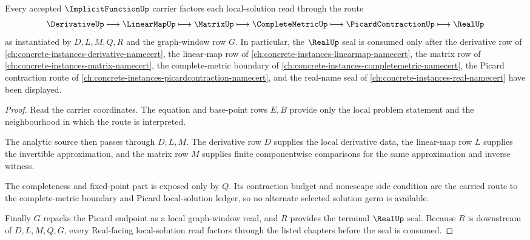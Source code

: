 \begin{theorem}\label{thm:implicit-function-picard-local-solution-route}
Every accepted $\ImplicitFunctionUp$ carrier factors each local-solution read through the route
$$
\DerivativeUp \longmapsto \LinearMapUp \longmapsto \MatrixUp \longmapsto \CompleteMetricUp \longmapsto \PicardContractionUp \longmapsto \RealUp
$$
as instantiated by $D,L,M,Q,R$ and the graph-window row $G$. In particular, the $\RealUp$ seal is consumed only after the derivative row of \autoref{ch:concrete-instances-derivative-namecert}, the linear-map row of \autoref{ch:concrete-instances-linearmap-namecert}, the matrix row of \autoref{ch:concrete-instances-matrix-namecert}, the complete-metric boundary of \autoref{ch:concrete-instances-completemetric-namecert}, the Picard contraction route of \autoref{ch:concrete-instances-picardcontraction-namecert}, and the real-name seal of \autoref{ch:concrete-instances-real-namecert} have been displayed.
\end{theorem}
\begin{proof}
Read the carrier coordinates. The equation and base-point rows $E,B$ provide only the local problem statement and the neighbourhood in which the route is interpreted.

The analytic source then passes through $D,L,M$. The derivative row $D$ supplies the local derivative data, the linear-map row $L$ supplies the invertible approximation, and the matrix row $M$ supplies finite componentwise comparisons for the same approximation and inverse witness.

The completeness and fixed-point part is exposed only by $Q$. Its contraction budget and nonescape side condition are the carried route to the complete-metric boundary and Picard local-solution ledger, so no alternate selected solution germ is available.

Finally $G$ repacks the Picard endpoint as a local graph-window read, and $R$ provides the terminal $\RealUp$ seal. Because $R$ is downstream of $D,L,M,Q,G$, every Real-facing local-solution read factors through the listed chapters before the seal is consumed.
\end{proof}


